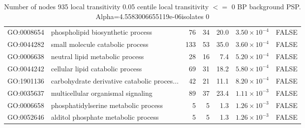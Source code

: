 \begin{table}[ht]
\begin{adjustbox}{max width=\textwidth}
\begin{tabular}{llrrrrl}
  GO:0008654 & phospholipid biosynthetic process & 76 & 34 & 20.0 & $3.50 \times 10^{-4}$ & FALSE \\ 
  GO:0044282 & small molecule catabolic process & 133 & 53 & 35.0 & $3.60 \times 10^{-4}$ & FALSE \\ 
  GO:0006638 & neutral lipid metabolic process & 28 & 16 & 7.4 & $5.20 \times 10^{-4}$ & FALSE \\ 
  GO:0044242 & cellular lipid catabolic process & 69 & 31 & 18.2 & $5.80 \times 10^{-4}$ & FALSE \\ 
  GO:1901136 & carbohydrate derivative catabolic proces... & 42 & 21 & 11.1 & $8.20 \times 10^{-4}$ & FALSE \\ 
  GO:0035637 & multicellular organismal signaling & 89 & 37 & 23.4 & $1.11 \times 10^{-3}$ & FALSE \\ 
  GO:0006658 & phosphatidylserine metabolic process & 5 & 5 & 1.3 & $1.26 \times 10^{-3}$ & FALSE \\ 
  GO:0052646 & alditol phosphate metabolic process & 5 & 5 & 1.3 & $1.26 \times 10^{-3}$ & FALSE \\ 
   \hline
\end{tabular}
\end{adjustbox}
\caption{Number of nodes 935 local transitivity 0.05 centile  local transitivity $<=$ 0 BP background PSP. Alpha=4.5583006655119e-06isolates 0} 
\label{tab:Number of nodes 935 local transitivity 0.05 centile  local transitivity $<=$ 0 BP background PSP. Alpha=4.5583006655119e-06isolates 0}
\end{table}

